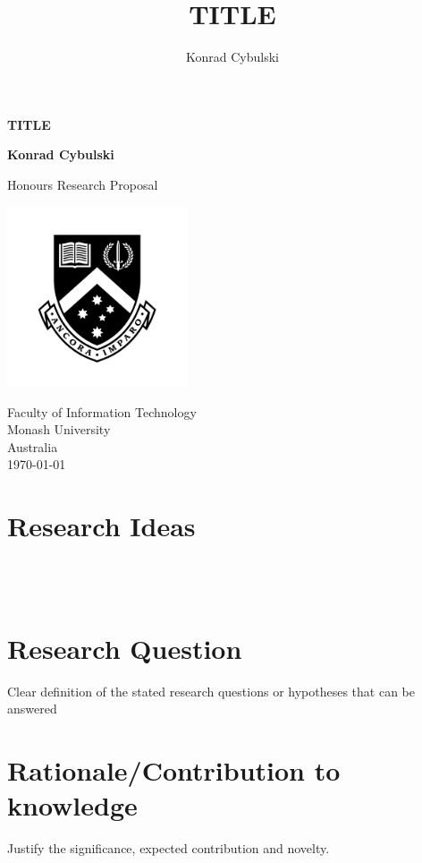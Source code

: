 \documentclass[10pt,a4paper]{article}
\author{Konrad Cybulski}
\title{TITLE}
\begin{document}
	
\begin{titlepage}
	\begin{center}
		\vspace*{1cm}
		
		\LARGE
		\textbf{TITLE}
		
		\vspace{2cm}
		\Large
		
		\textbf{Konrad Cybulski}
		
		\vfill
		
		Honours Research Proposal
		
		\vspace{0.8cm}
		
		\includegraphics[width=0.4\textwidth]{images/monash_emblem.jpg}
		
		\large
		Faculty of Information Technology\\
		Monash University\\
		Australia\\
		\today
		
	\end{center}
\end{titlepage}

\pagebreak
\tableofcontents
\pagebreak

\section{Research Ideas}

\\\\

\section{Research Question}
\begin{center}
	Clear definition of the stated research questions or hypotheses that can be answered
\end{center}


\section{Rationale/Contribution to knowledge}
\begin{center}
	Justify the significance, expected contribution and novelty.
\end{center}
\end{document}
